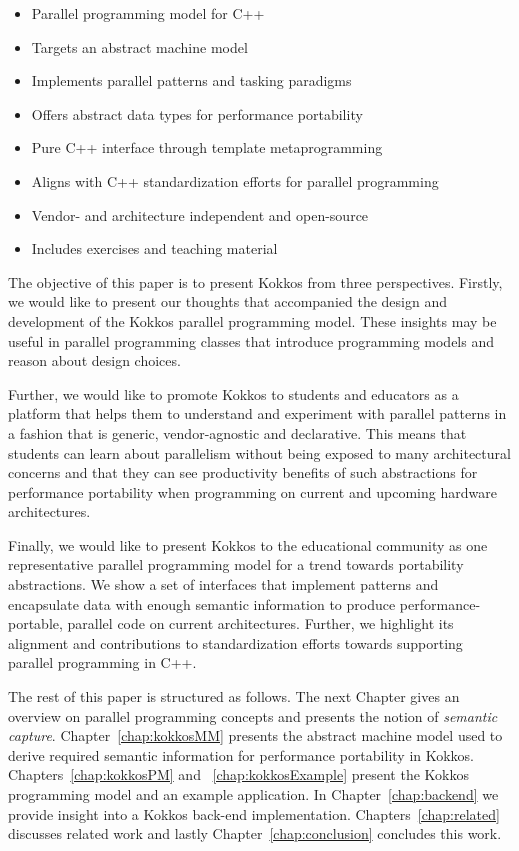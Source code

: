 \begin{itemize}
\item Parallel programming model for C++
\item Targets an abstract machine model
\item Implements parallel patterns and tasking paradigms
\item Offers abstract data types for performance portability
\item Pure C++ interface through template metaprogramming
\item Aligns with C++ standardization efforts for parallel programming
\item Vendor- and architecture independent and open-source
\item Includes exercises and teaching material
\end{itemize}

The objective of this paper is to present Kokkos from three perspectives. Firstly, we would like to present our thoughts that accompanied the design and development of the Kokkos parallel programming model. These insights may be  useful in parallel programming classes that introduce programming models and reason about design choices.

Further, we would like to promote Kokkos to students and educators as a platform that helps them to understand and experiment with parallel patterns in a fashion that is generic, vendor-agnostic and declarative. This means that students can learn about parallelism without being exposed to many architectural concerns and that they can see productivity benefits of such abstractions for performance portability when programming on current and upcoming hardware architectures.

Finally, we would like to present Kokkos to the educational community as one representative parallel programming model for a trend towards portability abstractions. We show a set of interfaces that implement patterns and encapsulate data with enough semantic information to produce performance-portable, parallel code on current architectures. Further, we highlight its alignment and contributions to standardization efforts towards supporting parallel programming in C++.

The rest of this paper is structured as follows. The next Chapter gives an overview on parallel programming concepts and presents the notion of \emph{semantic capture}. Chapter~\ref{chap:kokkosMM} presents the abstract machine model used to derive required semantic information for performance portability in Kokkos. Chapters~\ref{chap:kokkosPM} and ~\ref{chap:kokkosExample} present the Kokkos programming model and an example application. In Chapter~\ref{chap:backend} we provide insight into a Kokkos back-end implementation. Chapters~\ref{chap:related} discusses related work and lastly Chapter~\ref{chap:conclusion} concludes this work.

